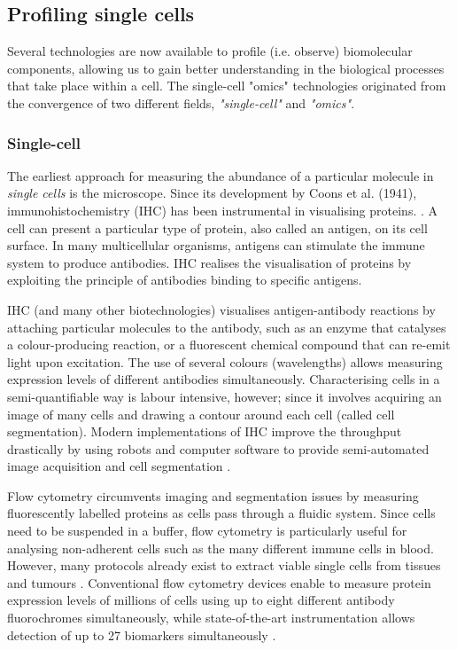 
\subsection{Profiling single cells}
Several technologies are now available to profile (i.e. observe) biomolecular components, allowing us to gain better understanding in the biological processes that take place within a cell. The single-cell "omics" technologies originated from the convergence of two different fields, \emph{"single-cell"} and \emph{"omics"}.

\subsubsection{Single-cell}
The earliest approach for measuring the abundance of a particular molecule in \emph{single cells} is the microscope.
Since its development by Coons et al. (1941), immunohistochemistry (IHC) has been instrumental in visualising proteins. \cite{coons_immunologicalpropertiesantibody_1941}. 
A cell can present a particular type of protein, also called an antigen, on its cell surface. In many multicellular organisms, antigens can stimulate the immune system to produce antibodies. IHC realises the visualisation of proteins by exploiting the principle of antibodies binding to specific antigens.

IHC (and many other biotechnologies) visualises antigen-antibody reactions by attaching particular molecules to the antibody, such as an enzyme that catalyses a colour-producing reaction, or a fluorescent chemical compound that can re-emit light upon excitation. The use of several colours (wavelengths) allows measuring expression levels of different antibodies simultaneously. Characterising cells in a semi-quantifiable way is labour intensive, however; since it involves acquiring an image of many cells and drawing a contour around each cell (called cell segmentation).
Modern implementations of IHC improve the throughput drastically by using robots and computer software to provide semi-automated image acquisition and cell segmentation \cite{theodosiou_automatedanalysisfish_2007}.

Flow cytometry \cite{fulwyler_electronicseparationbiological_1965} circumvents imaging and segmentation issues by measuring fluorescently labelled proteins as cells pass through a fluidic system.
Since cells need to be suspended in a buffer, flow cytometry is particularly useful for analysing non-adherent cells such as the many different immune cells in blood. However, many protocols already exist to extract viable single cells from tissues and tumours \cite{leelatian_preparingviablesingle_2017}.
Conventional flow cytometry devices enable to measure protein expression levels of millions of cells using up to eight different antibody fluorochromes simultaneously, while state-of-the-art instrumentation allows detection of up to 27 biomarkers simultaneously \cite{cossarizza_guidelinesuseflow_2017}.

